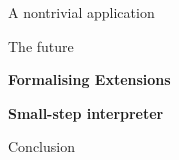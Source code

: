 \documentclass[11.5pt, aspectratio=169]{beamer}
\begin{document}
\begin{frame}{A nontrivial application}
\end{frame}


\begin{frame}{The future}
  \begin{fullpageitemize}
    \item {\large \textbf{Formalising Extensions}}
    \item {\large \textbf{Small-step interpreter}}
  \end{fullpageitemize}
\end{frame}

\begin{frame}{Conclusion}
\end{frame}
\end{document}
